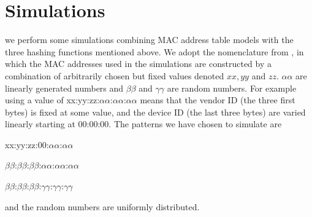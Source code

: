 \section{Simulations}
we perform some simulations combining MAC address table models with the three hashing functions mentioned 
above. We adopt the nomenclature from \cite{Stancu2003}, in which the MAC addresses used in the simulations
are constructed by a combination of arbitrarily chosen but fixed values denoted $xx, yy$ and $zz$. $\alpha\alpha$
are linearly generated numbers and $\beta\beta$ and $\gamma\gamma$ are random numbers. For example using a value of
xx:yy:zz:$\alpha\alpha$:$\alpha\alpha$:$\alpha\alpha$ means that the vendor ID (the three first bytes) is fixed at some value, and the 
device ID (the last three bytes) are varied linearly starting at 00:00:00. The patterns we have chosen to simulate are

xx:yy:zz:00:$\alpha\alpha$:$\alpha\alpha$

$\beta\beta$:$\beta\beta$:$\beta\beta$:$\alpha\alpha$:$\alpha\alpha$:$\alpha\alpha$

$\beta\beta$:$\beta\beta$:$\beta\beta$:$\gamma\gamma$:$\gamma\gamma$:$\gamma\gamma$

and the random numbers are uniformly distributed.
